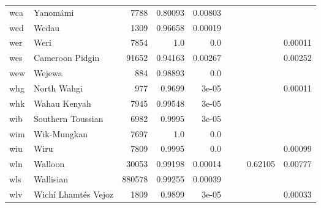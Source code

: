 \documentclass[11pt]{article}
\begin{document}
\begin{table*}[h]
{\begin{tabular}{llrrrrrrr}
wca         & Yanomámi         & 7788         & 0.80093         & 0.00803         &          &          &          &          \\

wed         & Wedau         & 1309         & 0.96658         & 0.00019         &          &          &          &          \\

wer         & Weri         & 7854         & 1.0         & 0.0         &          &          &          & 0.00011         \\

wes         & Cameroon Pidgin         & 91652         & 0.94163         & 0.00267         &          &          &          & 0.00252         \\

wew         & Wejewa         & 884         & 0.98893         & 0.0         &          &          &          &          \\

whg         & North Wahgi         & 977         & 0.9699         & 3e-05         &          &          &          & 0.00011         \\

whk         & Wahau Kenyah         & 7945         & 0.99548         & 3e-05         &          &          &          &          \\

wib         & Southern Toussian         & 6982         & 0.9995         & 3e-05         &          &          &          &          \\

wim         & Wik-Mungkan         & 7697         & 1.0         & 0.0         &          &          &          &          \\

wiu         & Wiru         & 7809         & 0.9995         & 0.0         &          &          &          & 0.00099         \\

wln         & Walloon         & 30053         & 0.99198         & 0.00014         &          &          & 0.62105         & 0.00777         \\

wls         & Wallisian         & 880578         & 0.99255         & 0.00039         &          &          &          &          \\

wlv         & Wichí Lhamtés Vejoz         & 1809         & 0.9899         & 3e-05         &          &          &          & 0.00033         \\


\end{tabular}}
\end{table*}
\end{document}
